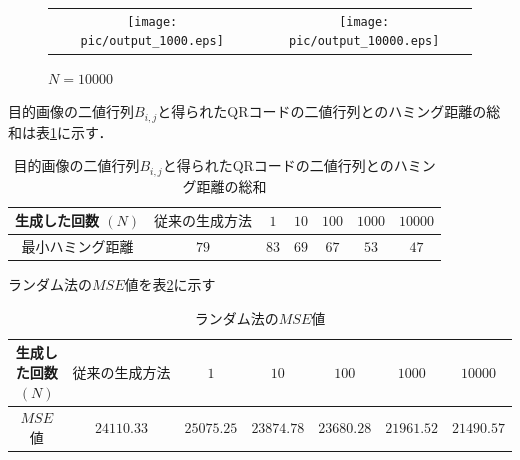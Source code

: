 \documentclass{thesis}
\begin{document}

\begin{figure}[H]
  \begin{tabular}{cc}
    \begin{minipage}[t]{0.45\hsize}
      \centering
      \texttt{[image: pic/output\_1000.eps]}
       \caption{$N=1000$}
      \label{fig:output_1000}
    \end{minipage} &
    \begin{minipage}[t]{0.45\hsize}
      \centering
      \texttt{[image: pic/output\_10000.eps]}
       \caption{$N=10000$}
      \label{fig:output_10000}
      \end{minipage}
  \end{tabular}
\end{figure}


目的画像の二値行列$B_{i,j}$と得られたQRコードの二値行列とのハミング距離の総和は表\ref{tab:Haming}に示す．

\begin{table}[H]
	\caption{目的画像の二値行列$B_{i,j}$と得られたQRコードの二値行列とのハミング距離の総和}
	\begin{center}
  		\begin{tabular}{|c|c|c|c|c|c|c|} \hline
     			生成した回数 $(N) $& $従来の生成方法$ & $1$ & $10$ & $100$ & $1000$ & $10000$  \\  \hline
   			最小ハミング距離 & $79$& $83$ & $69$ & $67$ & $53$ & $47$\\ \hline
     		\end{tabular}
  	\end{center}
  \label{tab:Haming}
\end{table}
 
ランダム法の$MSE$値を表\ref{tab:MSE}に示す

\begin{table}[H]
	\caption{ランダム法の$MSE$値}
	\begin{center}
  		\begin{tabular}{|c|c|c|c|c|c|c|} \hline
     			生成した回数 $(N) $& $従来の生成方法$ & $1$ & $10$ & $100$ & $1000$ & $10000$  \\  \hline
   			$MSE$値 & $24110.33$& $25075.25$ & $23874.78$ & $23680.28$ & $21961.52$ & $21490.57$\\ \hline
     		\end{tabular}
  	\end{center}
  \label{tab:MSE}
\end{table}
\end{document}

